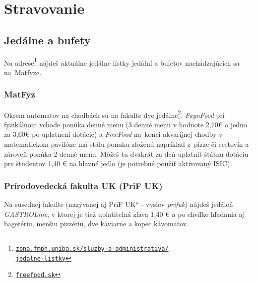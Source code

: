 \chapter{Stravovanie}

\section{Jedálne a bufety}

Na adrese\footnote{\href{https://zona.fmph.uniba.sk/sluzby-a-administrativa/jedalne-listky/}{\texttt{zona.fmph.uniba.sk/sluzby-a-administrativa/\\jedalne-listky}}} nájdeš aktuálne jedálne lístky jedální a bufetov nachádzajúcich sa na~Matfyze.

\subsection*{MatFyz}
Okrem automatov na chodbách sú na fakulte dve jedálne\footnote{\href{http://www.freefood.sk/}{\texttt{freefood.sk}}}. \newline \emph{FaynFood} pri fyzikálnom vchode ponúka denné menu (3 denné menu v hodnote 2,70€ a jedno za 3,60€ po uplatnení dotácie) a \emph{FreeFood} na~konci akvarijnej chodby v matematickom pavilóne má stálu ponuku zloženú napríklad z~pizze či cestovín a zároveň ponúka 2 denné menu. Môžeš tu dvakrát za deň uplatniť štátnu dotáciu pre študentov 1,40 € na hlavné jedlo (je potrebné použiť aktivovaný ISIC). %

\subsection*{Prírodovedecká fakulta UK (PriF UK)}

Na susednej fakulte (nazývanej aj \quotedblbase PriF UK`` - vyslov \emph{prifuk}) nájdeš jedáleň \emph{GASTROLine}, v ktorej je tiež uplatiteľná zľava 1,40 € a po chvíľke hľadania aj bagetériu, menšiu pizzériu, dve kaviarne a kopec kávomatov.


